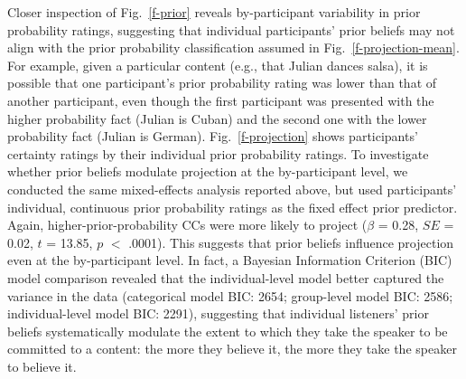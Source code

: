 \documentclass[11pt,fleqn]{article}
\newcommand{\figref}[1]{Fig.~\ref{#1}}
\newcommand{\6}{\mbox{$[\hspace*{-.6mm}[$}}
\newcommand{\9}{\mbox{$]\hspace*{-.6mm}]$}}
\begin{document}
Closer inspection of  \figref{f-prior} reveals by-participant variability in prior probability ratings, suggesting that individual participants' prior beliefs may not align with the prior probability classification assumed in  \figref{f-projection-mean}. For example, given a particular content (e.g., that Julian dances salsa), it is possible that one participant's prior probability rating was lower than that of another participant, even though the first participant was presented with the higher probability fact (Julian is Cuban) and the second one with the lower probability fact (Julian is German). \figref{f-projection} shows participants' certainty ratings by their individual prior probability ratings. %
To investigate whether prior beliefs modulate projection at the by-participant level,  we conducted the same mixed-effects analysis reported above, but used participants' individual, continuous prior probability ratings as the fixed effect prior predictor. Again, higher-prior-probability CCs were more likely to project ($\beta$ = 0.28, $SE$ = 0.02, $t$ = 13.85, $p$ $<$ .0001). This  suggests that prior beliefs influence projection even at the by-participant level. In fact, a Bayesian Information Criterion (BIC) model comparison  revealed that the individual-level model better captured the variance in the data (categorical model BIC: 2654; group-level model BIC: 2586; individual-level model BIC: 2291), suggesting that individual listeners' prior beliefs systematically modulate the extent to which they take the speaker to be committed to a content: the more they believe it, the more they take the speaker to believe it.
\end{document}
